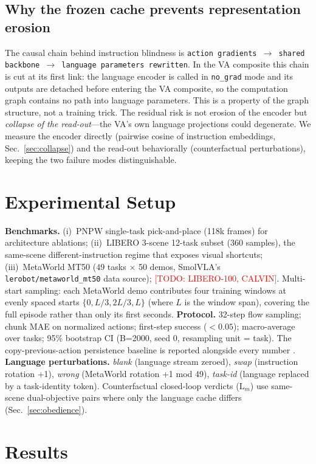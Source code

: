 \documentclass[10pt,twocolumn]{article}
\newcommand{\todo}[1]{\textcolor{red}{[TODO: #1]}}
\begin{document}
\subsection{Why the frozen cache prevents representation erosion}
\label{sec:mechanism}
The causal chain behind instruction blindness is
\texttt{action gradients $\rightarrow$ shared backbone $\rightarrow$
language parameters rewritten}. In the VA composite this chain is cut at its
first link: the language encoder is called in \texttt{no\_grad} mode and its
outputs are detached before entering the VA composite, so the computation
graph contains no path into language parameters. This is a property of the
graph structure, not a training trick. The residual risk is not erosion of
the encoder but \emph{collapse of the read-out}---the VA's own language
projections could degenerate. We measure the encoder directly (pairwise
cosine of instruction embeddings, Sec.~\ref{sec:collapse}) and the read-out
behaviorally (counterfactual perturbations), keeping the two failure modes
distinguishable.

\section{Experimental Setup}
\label{sec:setup}
\textbf{Benchmarks.} (i)~PNPW single-task pick-and-place (118k frames) for
architecture ablations; (ii)~LIBERO 3-scene 12-task subset (360 samples),
the same-scene different-instruction regime that exposes visual shortcuts;
(iii)~MetaWorld MT50 (49 tasks $\times$ 50 demos, SmolVLA's
\texttt{lerobot/metaworld\_mt50} data source); \todo{LIBERO-100, CALVIN}.
Multi-start sampling: each MetaWorld demo contributes four training windows
at evenly spaced starts $\{0, L/3, 2L/3, L\}$ (where $L$ is the window
span), covering the full episode rather than only its first seconds.
\textbf{Protocol.} 32-step flow sampling; chunk MAE on normalized actions;
first-step success ($<0.05$); macro-average over tasks; 95\% bootstrap CI
(B=2000, seed 0, resampling unit = task). The copy-previous-action
persistence baseline is reported alongside every number
\cite{copycat_ptp}. \textbf{Language perturbations.} \emph{blank} (language
stream zeroed), \emph{swap} (instruction rotation +1), \emph{wrong}
(MetaWorld rotation +1 mod 49), \emph{task-id} (language replaced by a
task-identity token). Counterfactual closed-loop verdicts (L$_m$) use
same-scene dual-objective pairs where only the language cache differs
(Sec.~\ref{sec:obedience}).

\section{Results}
\label{sec:results}
\end{document}
